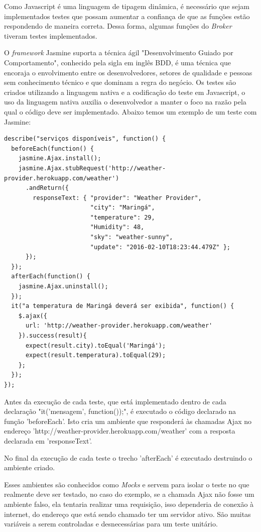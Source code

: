 Como Javascript é uma linguagem de tipagem dinâmica, é necessário que sejam implementados testes que possam aumentar a confiança de que as funções estão respondendo de maneira correta.
Dessa forma, algumas funções do \textit{Broker} tiveram testes implementados.

O \textit{framework} Jasmine suporta a técnica ágil "Desenvolvimento Guiado por Comportamento", conhecido pela sigla em inglês BDD, é uma técnica que encoraja o envolvimento entre os desenvolvedores, setores de qualidade e pessoas sem conhecimento técnico e que dominam a regra do negócio. Os testes são criados utilizando a linguagem nativa e a codificação do teste em Javascript, o uso da linguagem nativa auxilia o desenvolvedor a manter o foco na razão pela qual o código deve ser implementado.
Abaixo temos um exemplo de um teste com Jasmine:
\begin{verbatim}
describe("serviços disponíveis", function() {
  beforeEach(function() {
    jasmine.Ajax.install();
    jasmine.Ajax.stubRequest('http://weather-provider.herokuapp.com/weather')
      .andReturn({
        responseText: { "provider": "Weather Provider",
                        "city": "Maringá",
                        "temperature": 29,
                        "Humidity": 48,
                        "sky": "weather-sunny",
                        "update": "2016-02-10T18:23:44.479Z" };
      });
  });
  afterEach(function() {
    jasmine.Ajax.uninstall();
  });
  it("a temperatura de Maringá deverá ser exibida", function() {
    $.ajax({
      url: 'http://weather-provider.herokuapp.com/weather'
    }).success(result){
      expect(result.city).toEqual('Maringá');
      expect(result.temperatura).toEqual(29);
    };
  });
});
\end{verbatim}
Antes da execução de cada teste, que está implementado dentro de cada declaração "it('mensagem', function(){});", é executado o código declarado na função 'beforeEach'. Isto cria um ambiente que responderá às chamadas Ajax no endereço 'http://weather-provider.herokuapp.com/weather' com a resposta declarada em 'responseText'.

No final da execução de cada teste o trecho 'afterEach' é executado destruindo o ambiente criado.

Esses ambientes são conhecidos como \textit{Mocks} e servem para isolar o teste no que realmente deve ser testado, no caso do exemplo, se a chamada Ajax não fosse um ambiente falso, ela tentaria realizar uma requisição, isso dependeria de conexão à internet, do endereço que está sendo chamado ter um servidor ativo. São muitas variáveis a serem controladas e desnecessárias para um teste unitário.
